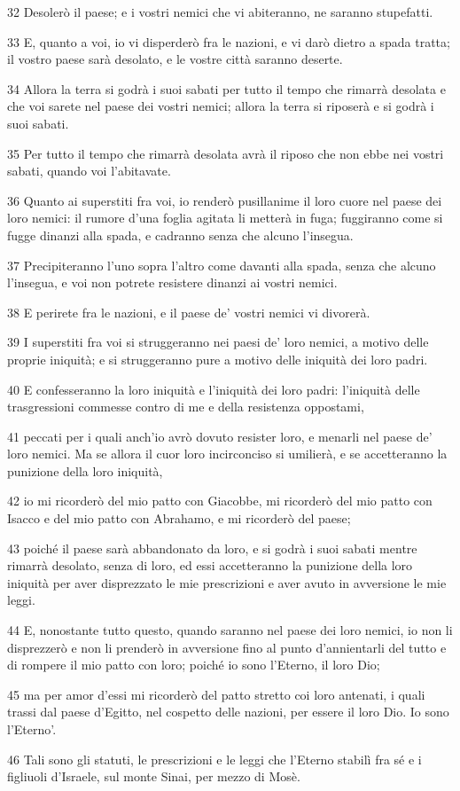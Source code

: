 \par 32 Desolerò il paese; e i vostri nemici che vi abiteranno, ne saranno stupefatti.
\par 33 E, quanto a voi, io vi disperderò fra le nazioni, e vi darò dietro a spada tratta; il vostro paese sarà desolato, e le vostre città saranno deserte.
\par 34 Allora la terra si godrà i suoi sabati per tutto il tempo che rimarrà desolata e che voi sarete nel paese dei vostri nemici; allora la terra si riposerà e si godrà i suoi sabati.
\par 35 Per tutto il tempo che rimarrà desolata avrà il riposo che non ebbe nei vostri sabati, quando voi l'abitavate.
\par 36 Quanto ai superstiti fra voi, io renderò pusillanime il loro cuore nel paese dei loro nemici: il rumore d'una foglia agitata li metterà in fuga; fuggiranno come si fugge dinanzi alla spada, e cadranno senza che alcuno l'insegua.
\par 37 Precipiteranno l'uno sopra l'altro come davanti alla spada, senza che alcuno l'insegua, e voi non potrete resistere dinanzi ai vostri nemici.
\par 38 E perirete fra le nazioni, e il paese de' vostri nemici vi divorerà.
\par 39 I superstiti fra voi si struggeranno nei paesi de' loro nemici, a motivo delle proprie iniquità; e si struggeranno pure a motivo delle iniquità dei loro padri.
\par 40 E confesseranno la loro iniquità e l'iniquità dei loro padri: l'iniquità delle trasgressioni commesse contro di me e della resistenza oppostami,
\par 41 peccati per i quali anch'io avrò dovuto resister loro, e menarli nel paese de' loro nemici. Ma se allora il cuor loro incirconciso si umilierà, e se accetteranno la punizione della loro iniquità,
\par 42 io mi ricorderò del mio patto con Giacobbe, mi ricorderò del mio patto con Isacco e del mio patto con Abrahamo, e mi ricorderò del paese;
\par 43 poiché il paese sarà abbandonato da loro, e si godrà i suoi sabati mentre rimarrà desolato, senza di loro, ed essi accetteranno la punizione della loro iniquità per aver disprezzato le mie prescrizioni e aver avuto in avversione le mie leggi.
\par 44 E, nonostante tutto questo, quando saranno nel paese dei loro nemici, io non li disprezzerò e non li prenderò in avversione fino al punto d'annientarli del tutto e di rompere il mio patto con loro; poiché io sono l'Eterno, il loro Dio;
\par 45 ma per amor d'essi mi ricorderò del patto stretto coi loro antenati, i quali trassi dal paese d'Egitto, nel cospetto delle nazioni, per essere il loro Dio. Io sono l'Eterno'.
\par 46 Tali sono gli statuti, le prescrizioni e le leggi che l'Eterno stabilì fra sé e i figliuoli d'Israele, sul monte Sinai, per mezzo di Mosè.

